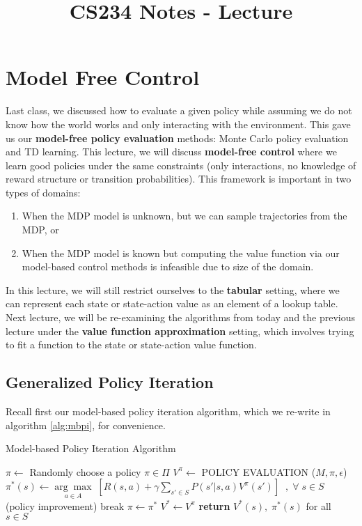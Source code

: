 \documentclass{article}
\title{CS234 Notes - Lecture \lecturenum \\ \lecturetitle }
\author{ \lecturescribe }
\theoremstyle{definition}
\theoremstyle{remark}
\begin{document}
\maketitle

\section{Model Free Control}

Last class, we discussed how to evaluate a given policy while assuming we do not know how the world works and only interacting with the environment.  This gave us our \textbf{model-free policy evaluation} methods: Monte Carlo policy evaluation and TD learning.  This lecture, we will discuss \textbf{model-free control} where we learn good policies under the same constraints (only interactions, no knowledge of reward structure or transition probabilities).  This framework is important in two types of domains:
\begin{enumerate}[noitemsep,partopsep=0pt,topsep=0pt,parsep=0pt]
	\item When the MDP model is unknown, but we can sample trajectories from the MDP, or
	\item When the MDP model is known but computing the value function via our model-based control methods is infeasible due to size of the domain.
\end{enumerate}

In this lecture, we will still restrict ourselves to the \textbf{tabular} setting, where we can represent each state or state-action value as an element of a lookup table.  Next lecture, we will be re-examining the algorithms from today and the previous lecture under the \textbf{value function approximation} setting, which involves trying to fit a function to the state or state-action value function.

\subsection{Generalized Policy Iteration}

Recall first our model-based policy iteration algorithm, which we re-write in algorithm \ref{alg:mbpi}, for convenience.

\begin{algorithm}
\caption{Model-based Policy Iteration Algorithm}\label{alg:mbpi}
\begin{algorithmic}[1]
\State $\pi \gets $ Randomly choose a policy $\pi \in \Pi$
\State $V^{\pi} \gets$ \small POLICY EVALUATION \normalsize ($M,\pi,\epsilon$)
\State $\pi^{\ast}(s) \gets \underset{a \in A}{\arg\max} \; \left[ R(s,a) + \gamma \sum_{s' \in S} P(s'|s,a) V^{\pi}(s') \right] \;\;,\; \forall \; s \in S$ (policy improvement)
\State break
\Else
\State $\pi \gets \pi^{\ast}$
\EndIf
\EndWhile
\label{mdp4label}
\State $V^{\ast} \gets V^{\pi}$
\State \textbf{return} $V^{\ast}(s), \; \pi^{\ast}(s)$ for all $s \in S$
\EndProcedure
\end{algorithmic}
\end{algorithm}
\end{document}
